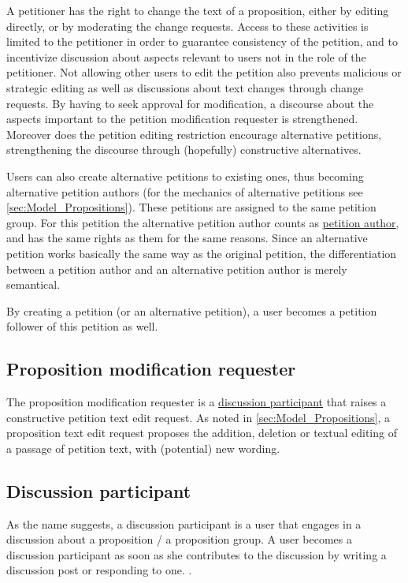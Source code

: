 A petitioner has the right to change the text of a proposition, either by editing directly, or by moderating the change requests. Access to these activities is limited to the petitioner in order to guarantee consistency of the petition, and to incentivize discussion about aspects relevant to users not in the role of the petitioner. Not allowing other users to edit the petition also prevents malicious or strategic editing as well as discussions about text changes through change requests. By having to seek approval for modification, a discourse about the aspects important to the petition modification requester is strengthened.
Moreover does the petition editing restriction encourage alternative petitions, strengthening the discourse through (hopefully) constructive alternatives.

Users can also create alternative petitions to existing ones, thus becoming alternative petition authors (for the mechanics of alternative petitions see \ref{sec:Model_Propositions}). These petitions are assigned to the same petition group. For this petition the alternative petition author counts as \hyperref[ssec:Roles_Petitioner]{petition author}, and has the same rights as them for the same reasons. Since an alternative petition works basically the same way as the original petition, the differentiation between a petition author and an alternative petition author is merely semantical. 

By creating a petition (or an alternative petition), a user becomes a petition follower of this petition as well.

\subsection{Proposition modification requester}
The proposition modification requester is a \hyperref[ssec:Roles_DiscussionParticipant]{discussion participant} that raises a constructive petition text edit request. 
As noted in \ref{sec:Model_Propositions}, a proposition text edit request proposes the addition, deletion or textual editing of a passage of petition text, with (potential) new wording. 

\subsection{Discussion participant}
\label{ssec:Roles_DiscussionParticipant}
As the name suggests, a discussion participant is a user that engages in a discussion about a proposition / a proposition group. A user becomes a discussion participant as soon as she contributes to the discussion by writing a discussion post or responding to one. .

